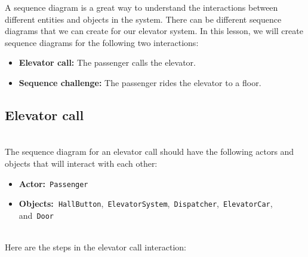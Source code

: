 

A sequence diagram is a great way to understand the interactions between different entities and objects in the system. There can be different sequence diagrams that we can create for our elevator system. In this lesson, we will create sequence diagrams for the following two interactions:

\begin{itemize}
\item
\protect{}\label{TUa_BJ0JS77gRm3LlZ4Zn}
\textbf{Elevator call:} The passenger calls the elevator.
\item
\protect{}\label{aJ9bHxUKwJgFdt0QrqVQX}
\textbf{Sequence challenge:} The passenger rides the elevator to a floor.
\end{itemize}

\subsection{Elevator call}\label{-xvkkT8V-VfJnKhLeJHMc}
\\
The sequence diagram for an elevator call should have the following actors and objects that will interact with each other:

\begin{itemize}
\item
\protect{}\label{KyrXYxhj7xn5QY7xpMpIz}
\textbf{Actor:}~\texttt{Passenger}
\item
\protect{}\label{Ccn6aN9FGMkBTfYPLKxLj}
\textbf{Objects:~}\texttt{HallButton},~\texttt{ElevatorSystem},~\texttt{Dispatcher},~\texttt{ElevatorCar}, and~\texttt{Door}
\end{itemize}
\\
Here are the steps in the elevator call interaction:

